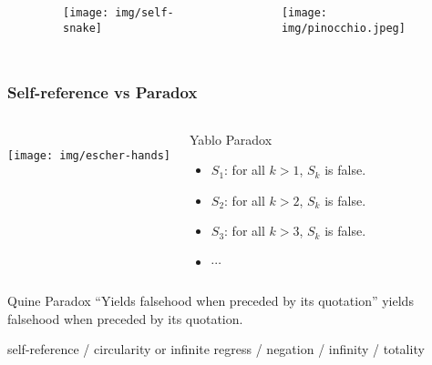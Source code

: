 \documentclass[UTF8,aspectratio=43,11pt,colorlinks,compress,openany]{beamer}%
\begin{document}
\begin{frame}
\begin{columns}
{\begin{minipage}{\textwidth}
\begin{itemize}
					\end{itemize}
			\end{minipage}}
			\begin{figure}\vspace*{-1.9cm}
				\hspace{-3cm}\texttt{[image: img/self-snake]}
			\end{figure}
			\begin{figure}\vspace*{-0.7cm}
				\hspace{-3cm}\texttt{[image: img/pinocchio.jpeg]}
			\end{figure}
	\end{columns}
\end{frame}

\begin{frame}\frametitle{Self-reference vs Paradox}
	\begin{columns}
			\centering{}\\
			\centering\texttt{[image: img/escher-hands]}\\
			\vspace{-1pt}
			\centering{}
		\vspace*{-2ex}
			\begin{block}{Yablo Paradox}
				\begin{itemize}
					\item $S_1$: for all $k>1$, $S_k$ is false.
					\item $S_2$: for all $k>2$, $S_k$ is false.
					\item $S_3$: for all $k>3$, $S_k$ is false.
					\item $\cdots$
				\end{itemize}
			\end{block}
	\end{columns}
\begin{block}{Quine Paradox}
	``Yields falsehood when preceded by its quotation''	yields falsehood when preceded by its quotation.
\end{block}
\begin{block}{}\small
	self-reference / circularity or infinite regress / negation / infinity / totality
\end{block}
\end{frame}
\end{document}

